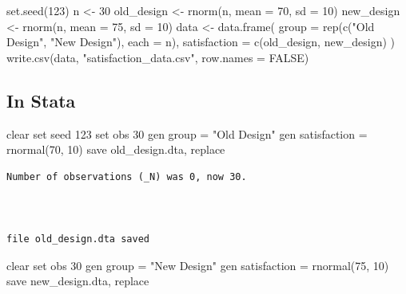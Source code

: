 \documentclass[
  letterpaper,
  DIV=11,
  numbers=noendperiod]{scrreprt}
\newenvironment{Shaded}{\begin{snugshade}}{\end{snugshade}}
\newcommand{\AttributeTok}[1]{\textcolor[rgb]{0.40,0.45,0.13}{#1}}
\newcommand{\ConstantTok}[1]{\textcolor[rgb]{0.56,0.35,0.01}{#1}}
\newcommand{\DecValTok}[1]{\textcolor[rgb]{0.68,0.00,0.00}{#1}}
\newcommand{\FunctionTok}[1]{\textcolor[rgb]{0.28,0.35,0.67}{#1}}
\newcommand{\KeywordTok}[1]{\textcolor[rgb]{0.00,0.23,0.31}{#1}}
\newcommand{\NormalTok}[1]{\textcolor[rgb]{0.00,0.23,0.31}{#1}}
\newcommand{\OtherTok}[1]{\textcolor[rgb]{0.00,0.23,0.31}{#1}}
\newcommand{\StringTok}[1]{\textcolor[rgb]{0.13,0.47,0.30}{#1}}
\begin{document}
\begin{Shaded}
\begin{Highlighting}[]
\FunctionTok{set.seed}\NormalTok{(}\DecValTok{123}\NormalTok{)}
\NormalTok{n }\OtherTok{\textless{}{-}} \DecValTok{30}
\NormalTok{old\_design }\OtherTok{\textless{}{-}} \FunctionTok{rnorm}\NormalTok{(n, }\AttributeTok{mean =} \DecValTok{70}\NormalTok{, }\AttributeTok{sd =} \DecValTok{10}\NormalTok{)}
\NormalTok{new\_design }\OtherTok{\textless{}{-}} \FunctionTok{rnorm}\NormalTok{(n, }\AttributeTok{mean =} \DecValTok{75}\NormalTok{, }\AttributeTok{sd =} \DecValTok{10}\NormalTok{)}
\NormalTok{data }\OtherTok{\textless{}{-}} \FunctionTok{data.frame}\NormalTok{(}
  \AttributeTok{group =} \FunctionTok{rep}\NormalTok{(}\FunctionTok{c}\NormalTok{(}\StringTok{"Old Design"}\NormalTok{, }\StringTok{"New Design"}\NormalTok{), }\AttributeTok{each =}\NormalTok{ n),}
  \AttributeTok{satisfaction =} \FunctionTok{c}\NormalTok{(old\_design, new\_design)}
\NormalTok{)}
\FunctionTok{write.csv}\NormalTok{(data, }\StringTok{"satisfaction\_data.csv"}\NormalTok{, }\AttributeTok{row.names =} \ConstantTok{FALSE}\NormalTok{)}
\end{Highlighting}
\end{Shaded}

\subsection{In Stata}\label{in-stata}

\begin{Shaded}
\begin{Highlighting}[]
\KeywordTok{clear}
\KeywordTok{set} \DecValTok{seed}\NormalTok{ 123}
\KeywordTok{set} \KeywordTok{obs}\NormalTok{ 30}
\KeywordTok{gen} \FunctionTok{group}\NormalTok{ = }\StringTok{"Old Design"}
\KeywordTok{gen}\NormalTok{ satisfaction = rnormal(70, 10)}
\KeywordTok{save}\NormalTok{ old\_design.dta, }\KeywordTok{replace}
\end{Highlighting}
\end{Shaded}

\begin{verbatim}
Number of observations (_N) was 0, now 30.



file old_design.dta saved
\end{verbatim}

\begin{Shaded}
\begin{Highlighting}[]
\KeywordTok{clear}
\KeywordTok{set} \KeywordTok{obs}\NormalTok{ 30}
\KeywordTok{gen} \FunctionTok{group}\NormalTok{ = }\StringTok{"New Design"}
\KeywordTok{gen}\NormalTok{ satisfaction = rnormal(75, 10)}
\KeywordTok{save}\NormalTok{ new\_design.dta, }\KeywordTok{replace}
\end{Highlighting}
\end{Shaded}
\end{document}
